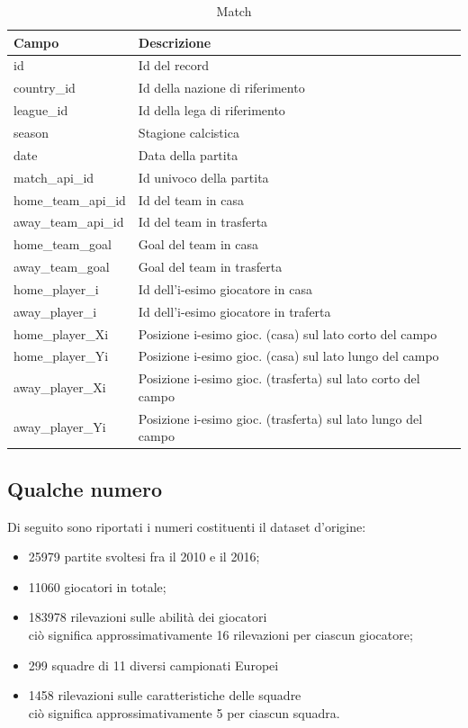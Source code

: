 \documentclass[hidelinks, 12pt]{article}
\begin{document}
\begin{table}[H]
	\caption{Match}\label{tab:match}
	\centering
	\begin{tabular}{|l|l|l|}
		\hline
		Campo & Descrizione \\
		\hline
		id & Id del record \\
		country\_id & Id della nazione di riferimento \\
		league\_id & Id della lega di riferimento \\
		season & Stagione calcistica \\
		date & Data della partita \\
		match\_api\_id & Id univoco della partita \\
		home\_team\_api\_id & Id del team in casa \\
		away\_team\_api\_id & Id del team in trasferta \\
		home\_team\_goal & Goal del team in casa \\
		away\_team\_goal & Goal del team in trasferta \\
		home\_player\_i & Id dell'i-esimo giocatore in casa \\
		away\_player\_i & Id dell'i-esimo giocatore in traferta \\
		home\_player\_Xi & Posizione i-esimo gioc. (casa) sul lato corto del campo \\
		home\_player\_Yi & Posizione i-esimo gioc. (casa) sul lato lungo del campo \\
		away\_player\_Xi & Posizione i-esimo gioc. (trasferta) sul lato corto del campo \\
		away\_player\_Yi & Posizione i-esimo gioc. (trasferta) sul lato lungo del campo \\
		\hline
	\end{tabular}
\end{table}



\subsection{Qualche numero}
\label{sec:dataset-numbers}

Di seguito sono riportati i numeri costituenti il dataset d'origine:

\begin{itemize}
	\item 25979 partite svoltesi fra il 2010 e il 2016;
	\item 11060 giocatori in totale;
	\item 183978 rilevazioni sulle abilità dei giocatori \\ ciò significa approssimativamente 16 rilevazioni per ciascun giocatore;
	\item 299 squadre di 11 diversi campionati Europei
	\item 1458 rilevazioni sulle caratteristiche delle squadre \\ ciò significa approssimativamente 5 per ciascun squadra.
\end{itemize}
\end{document}
